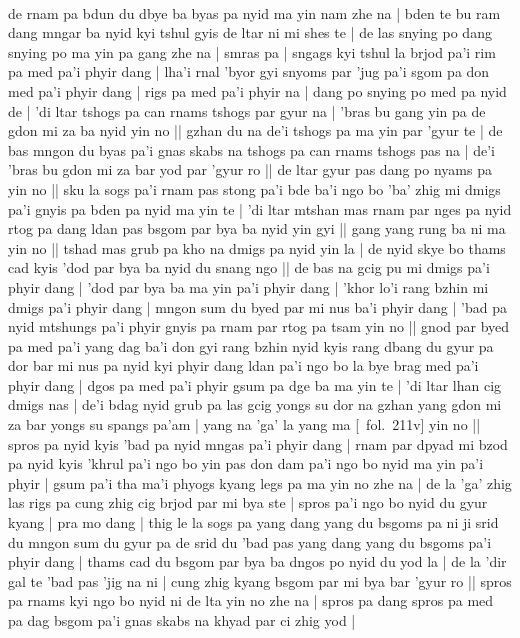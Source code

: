 \documentclass[12pt]{article}
\begin{document}
\textbf{\TVA}\\
de rnam pa bdun du dbye ba byas pa nyid ma yin nam zhe na | bden te bu ram dang mngar ba nyid kyi tshul gyis de ltar ni mi shes te | de las snying po dang snying po ma yin pa gang zhe na | smras pa | sngags kyi tshul la brjod pa'i rim pa med pa'i phyir dang | lha'i rnal 'byor gyi snyoms par 'jug pa'i sgom pa don med pa'i phyir dang | rigs pa med pa'i phyir na | dang po snying po med pa nyid de | 'di ltar tshogs pa can rnams tshogs par gyur na | 'bras bu gang yin pa de gdon mi za ba nyid yin no || gzhan du na de'i tshogs pa ma yin par 'gyur te | de bas mngon du byas pa'i gnas skabs na tshogs pa can rnams tshogs pas na | de'i 'bras bu gdon mi za bar yod par 'gyur ro || de ltar gyur pas dang po nyams pa yin no || sku la sogs pa'i rnam pas stong pa'i bde ba'i ngo bo 'ba' zhig mi dmigs pa'i gnyis pa bden pa nyid ma yin te | 'di ltar mtshan mas rnam par nges pa nyid rtog pa dang ldan pas bsgom par bya ba nyid yin gyi || gang yang rung ba ni ma yin no || tshad mas grub pa kho na dmigs pa nyid yin la | de nyid skye bo thams cad kyis 'dod par bya ba nyid du snang ngo || de bas na gcig pu mi dmigs pa'i phyir dang | 'dod par bya ba ma yin pa'i phyir dang | 'khor lo'i rang bzhin mi dmigs pa'i phyir dang | mngon sum du byed par mi nus ba'i phyir dang | 'bad pa nyid mtshungs pa'i phyir gnyis pa rnam par rtog pa tsam yin no || gnod par byed pa med pa'i yang dag ba'i don gyi rang bzhin nyid kyis rang dbang du gyur pa dor bar mi nus pa nyid kyi phyir dang ldan pa'i ngo bo la bye brag med pa'i phyir dang | dgos pa med pa'i phyir gsum pa dge ba ma yin te | 'di ltar lhan cig dmigs nas | de'i bdag nyid grub pa las gcig yongs su dor na gzhan yang gdon mi za bar yongs su spangs pa'am | yang na 'ga' la yang ma [\TVA\ fol.\ 211v] yin no || spros pa nyid kyis 'bad pa nyid mngas pa'i phyir dang | rnam par dpyad mi bzod pa nyid kyis 'khrul pa'i ngo bo yin pas don dam pa'i ngo bo nyid ma yin pa'i phyir | gsum pa'i tha ma'i phyogs kyang legs pa ma yin no zhe na | de la 'ga' zhig las rigs pa cung zhig cig brjod par mi bya ste | spros pa'i ngo bo nyid du gyur kyang | pra mo dang | thig le la sogs pa yang dang yang du bsgoms pa ni ji srid du mngon sum du gyur pa de srid du 'bad pas yang dang yang du bsgoms pa'i phyir dang | thams cad du bsgom par bya ba dngos po nyid du yod la | de la 'dir gal te 'bad pas 'jig na ni | cung zhig kyang bsgom par mi bya bar 'gyur ro || spros pa rnams kyi ngo bo nyid ni de lta yin no zhe na | spros pa dang spros pa med pa dag bsgom pa'i gnas skabs na khyad par ci zhig yod |\\
\end{document}
